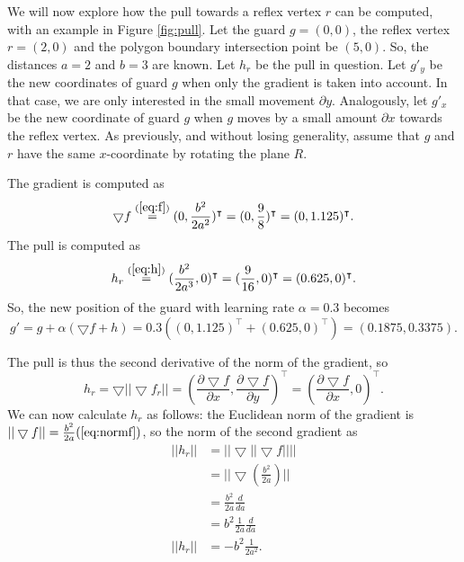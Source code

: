 We will now explore how the pull towards a reflex vertex $r$ can be computed, with an example in Figure \ref{fig:pull}. Let the guard $g = (0, 0)$, the reflex vertex $r = (2, 0)$ and the polygon boundary intersection point be $(5, 0)$. So, the distances $a = 2$ and $b = 3$ are known. Let $h_r$ be the pull in question. Let $g'_y$ be the new coordinates of guard $g$ when only the gradient is taken into account. In that case, we are only interested in the small movement $\partial y$. Analogously, let $g'_x$ be the new coordinate of guard $g$ when $g$ moves by a small amount $\partial x$ towards the reflex vertex. As previously, and without losing generality, assume that $g$ and $r$ have the same $x$-coordinate by rotating the plane $R$.

The gradient is computed as
$$\bigtriangledown f \overset{(\ref{eq:f})}{=} (0, \frac{b^2}{2a^2})^\intercal = (0, \frac{9}{8})^\intercal = (0, 1.125)^\intercal.$$ 
The pull is computed as 
$$h_r \overset{(\ref{eq:h})}{=} (\frac{b^2}{2a^3}, 0)^\intercal = (\frac{9}{16}, 0)^\intercal = (0.625, 0)^\intercal.$$
So, the new position of the guard with learning rate $\alpha = 0.3$ becomes 
$$g' = g + \alpha(\bigtriangledown f + h) = 0.3 ((0, 1.125)^\intercal + (0.625, 0)^\intercal) = (0.1875, 0.3375).$$

The pull is thus the second derivative of the norm of the gradient, so 
$$h_r = \bigtriangledown ||\bigtriangledown f_r|| = \left(\frac{\partial \bigtriangledown f}{\partial x}, \frac{\partial \bigtriangledown f}{\partial y}\right)^\intercal = \left(\frac{\partial \bigtriangledown f}{\partial x}, 0\right)^\intercal.$$  
We can now calculate $h_r$ as follows: the Euclidean norm of the gradient is $||\bigtriangledown f|| = \frac{b^2}{2a} (\ref{eq:normf})$, so the norm of the second gradient as 
\begin{align*}
||h_r||&= ||\bigtriangledown ||\bigtriangledown f|||| \\
       &= ||\bigtriangledown (\frac{b^2}{2a})|| \\
       &= \frac{b^2}{2a}\frac{d}{da} \\
       &= b^2\frac{1}{2a}\frac{d}{da} \\
||h_r||&= -b^2\frac{1}{2a^2}.
\end{align*}

